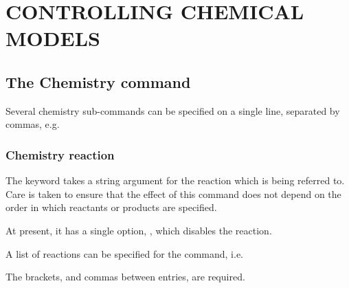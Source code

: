 \chapter{CONTROLLING CHEMICAL MODELS}

\section{The Chemistry command}

Several chemistry sub-commands can be specified on a single line,
separated by commas, e.g.


\subsection{Chemistry reaction}

The keyword  takes a string argument for the
reaction which is being referred to.  Care is taken to ensure that the
effect of this command does not depend on the order in which reactants
or products are specified.

At present, it has a single option, , which disables
the reaction.

A list of reactions can be specified for the command, i.e.


The brackets, and commas between entries, are required.
